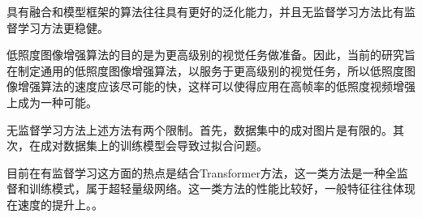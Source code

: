 \documentclass[letterpaper,12pt]{article}
\begin{document}
	具有融合和模型框架的算法往往具有更好的泛化能力，并且无监督学习方法比有监督学习方法更稳健。
	
	低照度图像增强算法的目的是为更高级别的视觉任务做准备。因此，当前的研究旨在制定通用的低照度图像增强算法，以服务于更高级别的视觉任务，所以低照度图像增强算法的速度应该尽可能的快，这样可以使得应用在高帧率的低照度视频增强上成为一种可能。
	
	无监督学习方法上述方法有两个限制。首先，数据集中的成对图片是有限的。其次，在成对数据集上的训练模型会导致过拟合问题。
	
	目前在有监督学习这方面的热点是结合Transformer方法，这一类方法是一种全监督和训练模式，属于超轻量级网络。这一类方法的性能比较好，一般特征往往体现在速度的提升上。。
	
	
%	
%	
%	
%	
%	
\end{document}
